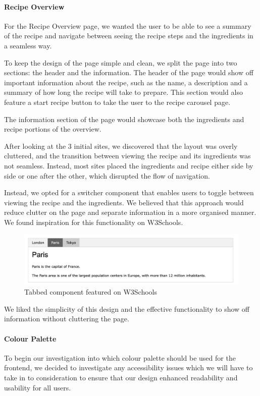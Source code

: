 \documentclass{article}
\begin{document}
\paragraph{Recipe Overview}
For the Recipe Overview page, we wanted the user to be able to see a summary of the recipe and navigate between seeing the recipe steps and the ingredients in a seamless way.

To keep the design of the page simple and clean, we split the page into two sections: the header and the information. The header of the page would show off important information about the recipe, such as the name, a description and a summary of how long the recipe will take to prepare. This section would also feature a start recipe button to take the user to the recipe carousel page.

The information section of the page would showcase both the ingredients and recipe portions of the overview.

After looking at the 3 initial sites, we discovered that the layout was overly cluttered, and the transition between viewing the recipe and its ingredients was not seamless. Instead, most sites placed the ingredients and recipe either side by side or one after the other, which disrupted the flow of navigation.

Instead, we opted for a switcher component that enables users to toggle between viewing the recipe and the ingredients. We believed that this approach would reduce clutter on the page and separate information in a more organised manner. We found inspiration for this functionality on W3Schools.

\begin{figure}[h]
  \includegraphics[width=1.0\textwidth]{assets/design-images/W3Schools tabbed component.png}
  \centering
  \caption{Tabbed component featured on W3Schools}
\end{figure}

We liked the simplicity of this design and the effective functionality to show off information without cluttering the page. 

\paragraph{Colour Palette}
To begin our investigation into which colour palette should be used for the frontend, we decided to investigate any accessibility issues which we will have to take in to consideration to ensure that our design enhanced readability and usability for all users. 
\end{document}
